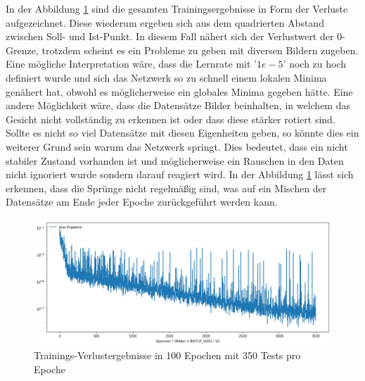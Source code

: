 In der Abbildung \ref{fig:lossDiag} sind die gesamten Trainingsergebnisse in Form der Verluste aufgezeichnet. 
Diese wiederum ergeben sich aus dem quadrierten Abstand zwischen Soll- und Ist-Punkt.
In diesem Fall nähert sich der Verlustwert der $0$-Grenze, trotzdem scheint es ein Probleme zu geben mit diversen Bildern zugeben.
Eine mögliche Interpretation wäre, dass die Lernrate mit '$1e-5$' noch zu hoch definiert wurde und sich das Netzwerk so zu schnell einem lokalen Minima genähert hat, obwohl es möglicherweise ein globales Minima gegeben hätte. 
Eine andere Möglichkeit wäre, dass die Datensätze Bilder beinhalten, in welchem das Gesicht nicht vollständig zu erkennen ist oder dass diese stärker rotiert sind. 
Sollte es nicht so viel Datensätze mit diesen Eigenheiten geben, so könnte dies ein weiterer Grund sein warum das Netzwerk springt. 
Dies bedeutet, dass ein nicht stabiler Zustand vorhanden ist und möglicherweise ein Rauschen in den Daten nicht ignoriert wurde sondern darauf reagiert wird.
In der Abbildung \ref{fig:lossDiag} lässt sich erkennen, dass die Sprünge nicht regelmäßig sind, was auf ein Mischen der Datensätze am Ende jeder Epoche zurückgeführt werden kann. 
\begin{figure}[ht!]
	\centering
	\includegraphics[scale=0.4]{images/loss-diagram-all-new.png}
	\caption{Trainings-Verlustergebnisse in 100 Epochen mit 350 Tests pro Epoche}
	\label{fig:lossDiag}
\end{figure} \phantom \newline


